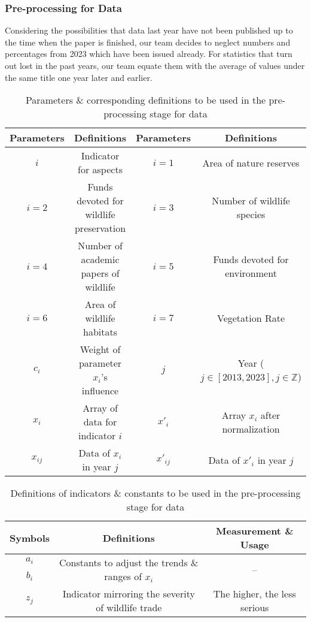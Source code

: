 \documentclass[12pt]{article}
\begin{document}
\subsubsection{Pre-processing for Data}
Considering the possibilities that data last year have not been published up to the time when the paper is finished, our team decides to neglect numbers and percentages from 2023 which have been issued already. For statistics that turn out lost in the past years, our team equate them with the average of values under the same title one year later and earlier.
\begin{table}[htbp]
\centering
	\begin{tabular}{|c|c|c|c|}
		\hline
		Parameters & Definitions & Parameters & Definitions\\
		\hline
		\hline
		$i$ & Indicator for aspects &$i=1$ & Area of nature reserves \\
		\hline
		$i=2$ & Funds devoted for wildlife preservation& $i=3$ & Number of wildlife species \\
		\hline
		$i=4$ & Number of academic papers of wildlife & $i=5$ & Funds devoted for environment\\
		\hline
		$i=6$ & Area of wildlife habitats & $i=7$ & Vegetation Rate\\
		\hline
		$c_i$ & Weight of parameter $x_i$'s influence & $j$ & Year ($j\in [2013,2023], j\in \mathbb{Z}$)\\
		\hline
		$x_i$ & Array of data for indicator $i$ & $x'_i$ & Array $x_i$ after normalization\\
		\hline
		$x_{ij}$ & Data of $x_i$ in year $j$ & $x'_{ij}$ & Data of $x'_i$ in year $j$\\
		\hline
	\end{tabular}
\caption{Parameters \& corresponding definitions to be used in the pre-processing stage for data}
\end{table}
\begin{table}[htbp]
\centering
	\begin{tabular}{|c|c|c|}
		\hline
		Symbols & Definitions & Measurement \& Usage\\
		\hline\hline
		$a_i$ & \multirow{2}{*}{Constants to adjust the trends \& ranges of $x_i$} & \multirow{2}{*}{--}\\
		$b_i$ &&\\
		\hline
		$z_j$ & Indicator mirroring the severity of wildlife trade & The higher, the less serious\\
		\hline
	\end{tabular}
\caption{Definitions of indicators \& constants to be used in the pre-processing stage for data}
\end{table}
\end{document}
